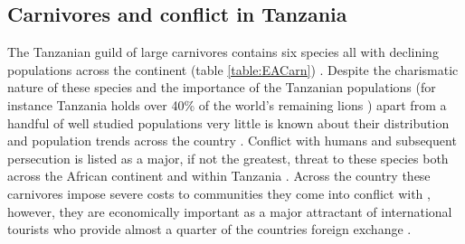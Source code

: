 \subsection{Carnivores and conflict in Tanzania}

The Tanzanian guild of large carnivores contains six species all with declining populations across the continent (table \ref{table:EACarn}) \cite{Winterbach2013}. Despite the charismatic nature of these species and the importance of the Tanzanian populations (for instance Tanzania holds over 40\% of the world's remaining lions \cite{Riggio2013}) apart from a handful of well studied populations very little is known about their distribution and population trends across the country \cite{TAWIRI2009}. Conflict with humans and subsequent persecution is listed as a major, if not the greatest, threat to these species both across the African continent and within Tanzania \cite{IUCN2016,Ray2005,TAWIRI2009}. Across the country these carnivores impose severe costs to communities they come into conflict with \cite{Packer2005,Dickman2008,Kissui2008}, however, they are economically important as a major attractant of international tourists who provide almost a quarter of the countries foreign exchange \cite{Bank2015}. 
\\


